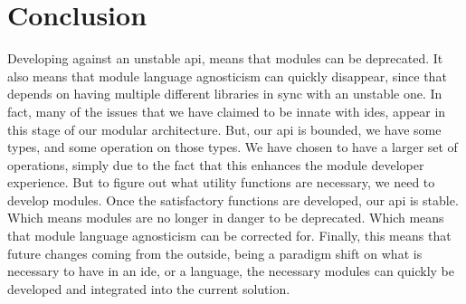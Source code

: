 \section{Conclusion} \label{sec:conclusion}

Developing against an unstable \gls*{api}, means that modules can be
deprecated. It also means that module language agnosticism can quickly
disappear, since that depends on having multiple different libraries in sync
with an unstable one. In fact, many of the issues that we have claimed to be
innate with \gls*{ide}s, appear in this stage of our modular architecture. But,
our \gls*{api} is bounded, we have some types, and some operation on those
types. We have chosen to have a larger set of operations, simply due to the
fact that this enhances the module developer experience. But to figure out what
utility functions are necessary, we need to develop modules. Once the
satisfactory functions are developed, our \gls*{api} is stable. Which means
modules are no longer in danger to be deprecated. Which means that module
language agnosticism can be corrected for. Finally, this means that future
changes coming from the outside, being a paradigm shift on what is necessary to
have in an \gls*{ide}, or a language, the necessary modules can quickly be
developed and integrated into the current solution.

